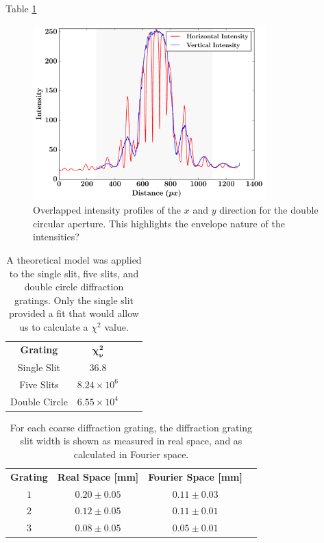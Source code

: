 \documentclass[twocolumn]{revtex4}
\begin{document}
Table \ref{theoretical_model_applying}
\begin{figure}[!h]
\begin{center}
\includegraphics[width=9cm]{results/double_circle_intensity_overlapped}
\caption[]{Overlapped intensity profiles of the $x$ and $y$ direction for the double circular aperture. This highlights the envelope nature of the intensities?}
\end{center}
\end{figure}
\begin{table}[h!]
\centering
\begin{tabular}{c@{\hskip 20pt}c@{\hskip 20pt}c@{\hskip 20pt}c} 
 \hline
 \textbf{Grating} & $\boldsymbol{\chi_\nu^2}$ \\ [0.5ex] 
 Single Slit &$36.8$ \\ 
 Five Slits & $8.24\times10^{6}$ \\
 Double Circle & $6.55\times10^{4}$ \\
 \hline
\end{tabular}
\caption{A theoretical model was applied to the single slit, five slits, and double circle diffraction gratings. Only the single slit provided a fit that would allow us to calculate a $\chi^2$ value.}
\label{theoretical_model_applying}
\end{table}

\begin{table}[h!]
\centering
\begin{tabular}{c@{\hskip 15pt}c@{\hskip 15pt}c@{\hskip 10pt}c} 
 \hline
 \textbf{Grating} & \textbf{Real Space [mm]} & \textbf{Fourier Space [mm]} \\ [0.5ex] 
 $1$ &$0.20\pm0.05$ & $0.11\pm0.03$ \\ 
 $2$ & $0.12\pm0.05$ & $0.11\pm0.01$ \\
 $3$ & $0.08\pm0.05$ & $0.05\pm0.01$ \\
 \hline
\end{tabular}
\caption{For each coarse diffraction grating, the diffraction grating slit width is shown as measured in real space, and as calculated in Fourier space.}
\end{table}
\end{document}
